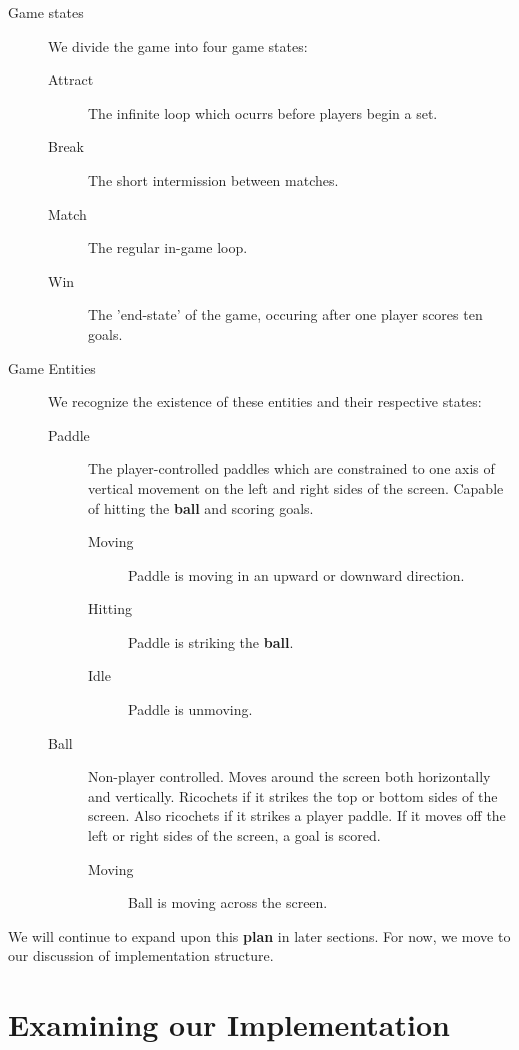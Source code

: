 \documentclass{report}
\newcommand{\state}[1]{\textbf{#1}}
\newcommand{\ball}{\textbf{ball}\xspace}
\begin{document}
\begin{description}
    \item[Game states] We divide the game into four game states:
    \begin{description}
        \item[Attract] The infinite loop which ocurrs before players begin a set.
        \item[Break] The short intermission between matches.
        \item[Match] The regular in-game loop.
        \item[Win]   The 'end-state' of the game, occuring after one player scores ten goals. 
    \end{description}
    \item[Game Entities] We recognize the existence of these entities and their respective states: 
    \begin{description}
        \item[Paddle] The player-controlled paddles which are constrained to one axis of vertical movement on the left and right sides of the screen. Capable of hitting the \ball and scoring goals.
        \begin{description}
            \item[Moving] Paddle is moving in an upward or downward direction.
            \item[Hitting] Paddle is striking the \ball.  
            \item[Idle] Paddle is unmoving. 
        \end{description} 
        \item[Ball] Non-player controlled. Moves around the screen both horizontally and vertically. Ricochets if it strikes the top or bottom sides of the screen. Also ricochets if it strikes a player paddle. If it moves off the left or right sides of the screen, a goal is scored. 
        \begin{description}
            \item[Moving] Ball is moving across the screen.
        \end{description}
    \end{description}
    \item[] 
\end{description}

We will continue to expand upon this \state{plan} in later sections. For now, we move to our discussion of implementation structure.

\section{Examining our Implementation}
\end{document}

